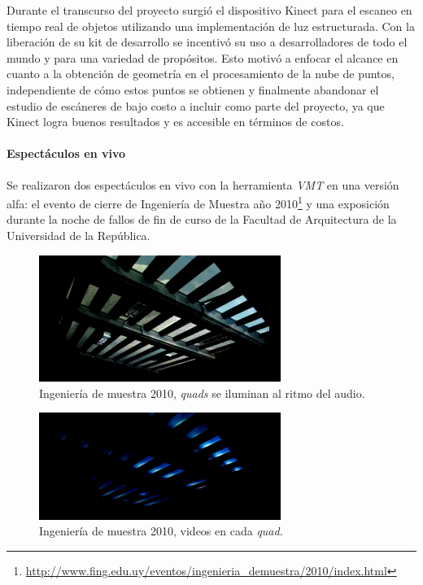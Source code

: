 Durante el transcurso del proyecto surgió el dispositivo Kinect para el escaneo en tiempo real de objetos utilizando una implementación de luz estructurada. Con la liberación de su kit de desarrollo se incentivó su uso a desarrolladores de todo el mundo y para una variedad de propósitos. Esto motivó a enfocar el alcance en cuanto a la obtención de geometría en el procesamiento de la nube de puntos, independiente de cómo estos puntos se obtienen y finalmente abandonar el estudio de escáneres de bajo costo a incluir como parte del proyecto, ya que Kinect logra buenos resultados y es accesible en términos de costos.

\paragraph{Espectáculos en vivo}

Se realizaron dos espectáculos en vivo con la herramienta \emph{VMT} en una versión alfa: el evento de cierre de Ingeniería de Muestra año 2010\footnote{\url{http://www.fing.edu.uy/eventos/ingenieria_demuestra/2010/index.html}} y una exposición durante la noche de fallos de fin de curso de la Facultad de Arquitectura de la Universidad de la República.
\begin{figure}[H]
  \centering
    \includegraphics[width=0.7\textwidth]{./Cap7_conclusiones/ingMuestra1.png}
  \caption[Ingeniería de muestra 2010, \emph{quads} se iluminan al ritmo del audio.]{Ingeniería de muestra 2010, \emph{quads} se iluminan al ritmo del audio.}
  \label{fig:ingMuestra1}
\end{figure}
\begin{figure}[H]
  \centering
    \includegraphics[width=0.7\textwidth]{./Cap7_conclusiones/ingMuestra2.png}
  \caption[Ingeniería de muestra 2010, videos en cada \emph{quad}.]{Ingeniería de muestra 2010, videos en cada \emph{quad}.}
  \label{fig:ingMuestra2}
\end{figure}

